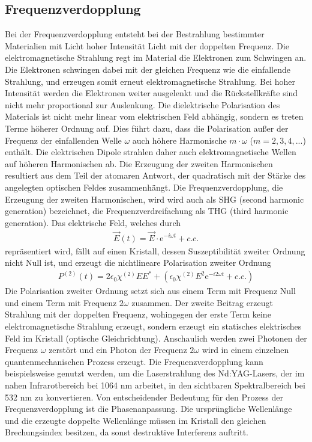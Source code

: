 \documentclass[twoside,colorback,accentcolor=tud4c,11pt]{tudreport}
\begin{document}
\subsection{Frequenzverdopplung}\label{freq}
Bei der Frequenzverdopplung entsteht bei der Bestrahlung bestimmter Materialien mit Licht hoher Intensität Licht mit der doppelten Frequenz. Die elektromagnetische Strahlung regt im Material die Elektronen zum Schwingen an. Die Elektronen schwingen dabei mit der gleichen Frequenz wie die einfallende Strahlung, und erzeugen somit erneut elektromagnetische Strahlung. Bei hoher Intensität werden die Elektronen weiter ausgelenkt und die Rückstellkräfte sind nicht mehr proportional zur Auslenkung. Die dielektrische Polarisation des Materials ist nicht mehr linear vom elektrischen Feld abhängig, sondern es treten Terme höherer Ordnung auf. Dies führt dazu, dass die Polarisation außer der Frequenz der einfallenden Welle $\omega$ auch höhere Harmonische $m\cdot \omega$ ($m=2,3,4,...$) enthält. Die elektrischen Dipole strahlen daher auch elektromagnetische Wellen auf höheren Harmonischen ab. Die Erzeugung der zweiten Harmonischen resultiert aus dem Teil der atomaren Antwort, der quadratisch mit der Stärke des angelegten optischen Feldes zusammenhängt. Die Frequenzverdopplung, die Erzeugung der zweiten Harmonischen, wird wird auch als SHG (second harmonic generation) bezeichnet, die Frequenzverdreifachung als THG (third harmonic generation). 
Das elektrische Feld, welches durch
\begin{align*}
\vec{E}(t)=\vec{E}\cdot\text{e}^{-i\omega t} + c.c.
\end{align*}
repräsentiert wird, fällt auf einen Kristall, dessen Suszeptibilität zweiter Ordnung nicht Null ist, und erzeugt die nichtlineare Polarisation zweiter Ordnung
\begin{align*}
P^{(2)}(t)=2\epsilon_0\chi^{(2)}EE^*+\left(\epsilon_0\chi^{(2)}E^2\text{e}^{-i2\omega t}+c.c.\right)
\end{align*} 
Die Polarisation zweiter Ordnung setzt sich aus einem Term mit Frequenz Null und einem Term mit Frequenz $2\omega$ zusammen. Der zweite Beitrag erzeugt Strahlung mit der doppelten Frequenz, wohingegen der erste Term keine elektromagnetische Strahlung erzeugt, sondern erzeugt ein statisches elektrisches Feld im Kristall (optische Gleichrichtung).
Anschaulich werden zwei Photonen der Frequenz $\omega$ zerstört und ein Photon der Frequenz $2\omega$ wird in einem einzelnen quantenmechanischen Prozess erzeugt. Die Frequenzverdopplung kann beispielsweise genutzt werden, um die Laserstrahlung des Nd:YAG-Lasers, der im nahen Infrarotbereich bei 1064 nm arbeitet, in den sichtbaren Spektralbereich bei 532 nm zu konvertieren. Von entscheidender Bedeutung für den Prozess der Frequenzverdopplung ist die Phasenanpassung. Die ursprüngliche Wellenlänge und die erzeugte doppelte Wellenlänge müssen im Kristall den gleichen Brechungsindex besitzen, da sonst destruktive Interferenz auftritt.
\cite{2,6,7}	
\end{document}
